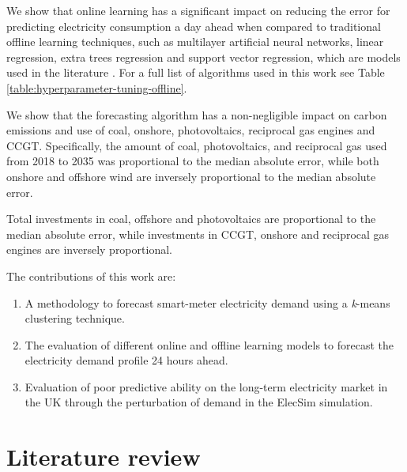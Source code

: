
We show that online learning has a significant impact on reducing the error for predicting electricity consumption a day ahead when compared to traditional offline learning techniques, such as multilayer artificial neural networks, linear regression, extra trees regression and support vector regression, which are models used in the literature \cite{Ahmad2017, Chen2004,Lu1993}. For a full list of algorithms used in this work see Table \ref{table:hyperparameter-tuning-offline}.

We show that the forecasting algorithm has a non-negligible impact on carbon emissions and use of coal, onshore, photovoltaics, reciprocal gas engines and CCGT. Specifically, the amount of coal, photovoltaics, and reciprocal gas used from 2018 to 2035 was proportional to the median absolute error, while both onshore and offshore wind are inversely proportional to the median absolute error.

Total investments in coal, offshore and photovoltaics are proportional to the median absolute error, while investments in CCGT, onshore and reciprocal gas engines are inversely proportional.




The contributions of this work are:

\begin{enumerate}
	\item A methodology to forecast smart-meter electricity demand using a \textit{k}-means clustering technique.
	\item The evaluation of different online and offline learning models to forecast the electricity demand profile 24 hours ahead.
	\item Evaluation of poor predictive ability on the long-term electricity market in the UK through the perturbation of demand in the ElecSim simulation.
\end{enumerate}
















\section{Literature review}
\label{forecast:sec:litreview}


